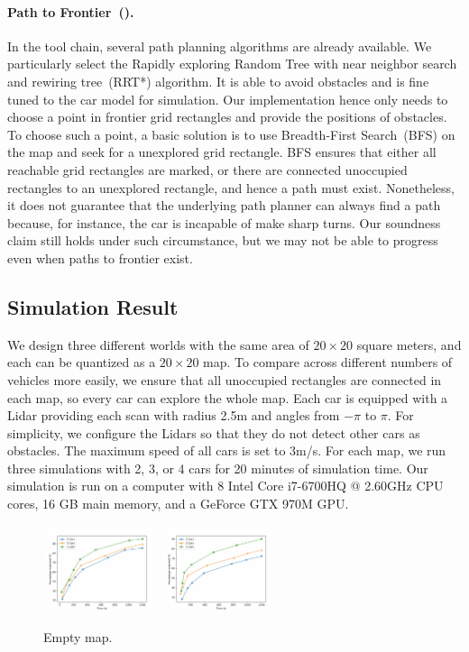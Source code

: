 \paragraph{Path to Frontier~(\PathToFrontier).}
In the \CyPhyHouse tool chain, several path planning algorithms are already available.
We particularly select the Rapidly exploring Random Tree with near neighbor search and rewiring tree~(RRT*) algorithm.
It is able to avoid obstacles and is fine tuned to the car model for simulation.
Our \PathToFrontier implementation hence only needs to choose a point in frontier grid rectangles and provide the positions of obstacles.
To choose such a point, a basic solution is to use Breadth-First Search~(BFS) on the map and seek for a unexplored grid rectangle.
BFS ensures that either all reachable grid rectangles are marked,
or there are connected unoccupied rectangles to an unexplored rectangle, and hence a path must exist.
Nonetheless, it does not guarantee that the underlying path planner can always find a path because,
for instance, the car is incapable of make sharp turns.
Our soundness claim still holds under such circumstance, but we may not be able to progress even when paths to frontier exist.


\subsection{Simulation Result}

We design three different worlds with the same area of $20\times20$ square meters,
and each can be quantized as a $20 \times 20$ map.
To compare across different numbers of vehicles more easily,
we ensure that all unoccupied rectangles are connected in each map,
so every car can explore the whole map.
Each car is equipped with a Lidar providing each scan with radius 2.5m and angles from $-\pi$ to $\pi$.
For simplicity, we configure the Lidars so that they do not detect other cars as obstacles.
The maximum speed of all cars is set to 3m/s.
For each map, we run three simulations with 2, 3, or 4 cars for 20 minutes of simulation time.
Our simulation is run on a computer with 8 Intel Core i7-6700HQ @ 2.60GHz CPU cores, 16 GB main memory, and a GeForce GTX 970M GPU.


\begin{figure}[t]
\includegraphics[width=0.3\textwidth]{figs/exp-empty.png}
\includegraphics[width=0.3\textwidth]{figs/exp-i-shape.png}
\caption{Empty map.}\label{fig:percent}
\end{figure}

